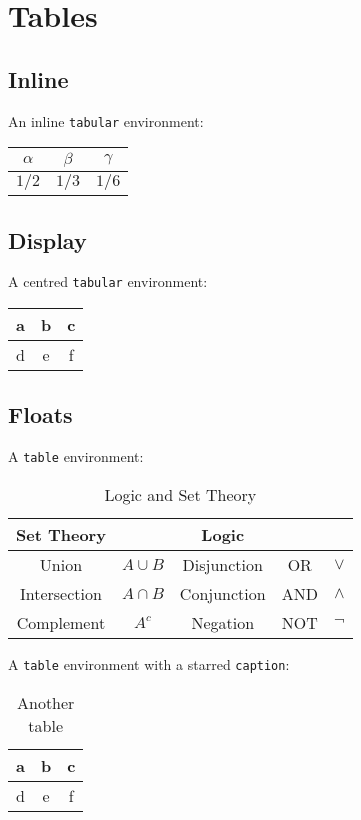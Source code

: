 
\section{Tables}

\subsection{Inline}
An inline \texttt{tabular} environment:
\begin{tabular}{|ccc|}\hline
$\alpha$ & $\beta$ & $\gamma$ \\ \hline
$1/2$ & $1/3$ & $1/6$ \\ \hline
\end{tabular}

\subsection{Display}
A centred \texttt{tabular} environment:
\begin{center}
\begin{tabular}{|c|c|c|}
\hline
a & b & c \\
\hline
d & e & f \\
\hline
\end{tabular}
\end{center}

\subsection{Floats}

A {\tt table} environment:
\begin{table}[htb]
\centering
\begin{tabular}{|c|c||c|c|c|} \hline
Set Theory 		& 			& Logic			&		& \\ \hline
Union			& $A\cup B$	& Disjunction 	& OR 	& $\lor$	\\
Intersection		& $A\cap B$	& Conjunction	& AND 	& $\land$\\
Complement		& $A^c$		& Negation		& NOT 	& $\lnot$	\\ \hline
\end{tabular}
\caption{Logic and Set Theory}
\end{table}

A {\tt table} environment with a starred {\tt caption}:
\begin{table}[ht]
\centering
\begin{tabular}{|c|c|c|}
\hline
a & b & c \\
\hline
d & e & f \\
\hline
\end{tabular}
\caption*{Another table}
\end{table}


